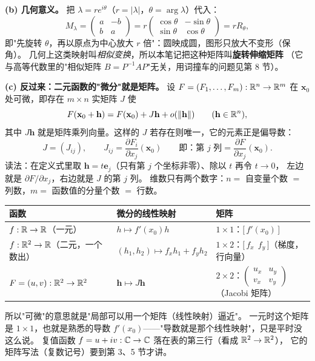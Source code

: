 \smallskip
\noindent\textbf{(b) 几何意义。} 把 $\lambda=re^{i\theta}$（$r=|\lambda|$，$\theta=\arg\lambda$）代入：
\[
M_\lambda=\begin{pmatrix} a&-b\\ b&a\end{pmatrix}
=r\begin{pmatrix}\cos\theta&-\sin\theta\\ \sin\theta&\cos\theta\end{pmatrix}=rR_\theta,
\]
即"先旋转 $\theta$，再以原点为中心放大 $r$ 倍"：圆映成圆，图形只放大不变形（保角）。
几何上这类映射叫\emph{相似变换}，所以本笔记把这种矩阵叫\textbf{旋转伸缩矩阵}
（它与高等代数里的"相似矩阵 $B=P^{-1}AP$"无关，用词撞车的问题见第 8 节）。

\smallskip
\noindent\textbf{(c) 反过来：二元函数的"微分"就是矩阵。}
设 $F=(F_1,\dots,F_m):\mathbb{R}^n\to\mathbb{R}^m$ 在 $\mathbf x_0$ 处可微，即存在 $m\times n$ 实矩阵 $J$ 使
\[
F(\mathbf x_0+\mathbf h)=F(\mathbf x_0)+J\mathbf h+o(\|\mathbf h\|)\qquad(\mathbf h\in\mathbb{R}^n),
\]
其中 $J\mathbf h$ 就是矩阵乘列向量。这样的 $J$ 若存在则唯一，它的元素正是偏导数：
\[
J=(J_{ij}),\qquad J_{ij}=\frac{\partial F_i}{\partial x_j}(\mathbf x_0)
\qquad\text{即：第 }j\text{ 列}=\frac{\partial F}{\partial x_j}(\mathbf x_0).
\]
读法：在定义式里取 $\mathbf h=t\mathbf e_j$（只有第 $j$ 个坐标非零）、除以 $t$ 再令 $t\to0$，
左边就是 $\partial F/\partial x_j$，右边就是 $J$ 的第 $j$ 列。
维数只有两个数字：$n=$ 自变量个数 $=$ 列数，$m=$ 函数值的分量个数 $=$ 行数。

\begin{center}
\renewcommand{\arraystretch}{1.4}
\begin{tabular}{|l|l|l|}
\hline
函数 & 微分的线性映射 & 矩阵 \\
\hline
$f:\mathbb{R}\to\mathbb{R}$（一元） & $h\mapsto f'(x_0)h$ & $1\times1$：$\bigl[\,f'(x_0)\,\bigr]$\\
\hline
$f:\mathbb{R}^2\to\mathbb{R}$（二元，一个数出） & $(h_1,h_2)\mapsto f_xh_1+f_yh_2$ & $1\times2$：$\bigl[\,f_x\ \ f_y\,\bigr]$（梯度，行向量）\\
\hline
$F=(u,v):\mathbb{R}^2\to\mathbb{R}^2$ & $\mathbf h\mapsto J\mathbf h$ & $2\times2$：$\begin{pmatrix}u_x&u_y\\v_x&v_y\end{pmatrix}$（Jacobi 矩阵）\\
\hline
\end{tabular}
\end{center}

\noindent
所以"可微"的意思就是"局部可以用一个矩阵（线性映射）逼近"。
一元时这个矩阵是 $1\times1$，也就是熟悉的导数 $f'(x_0)$——"导数就是那个线性映射"，只是平时没这么说。
复值函数 $f=u+iv:\mathbb{C}\to\mathbb{C}$ 落在表的第三行（看成 $\mathbb{R}^2\to\mathbb{R}^2$），
它的矩阵写法（复数记号）要到第 3、5 节才讲。

